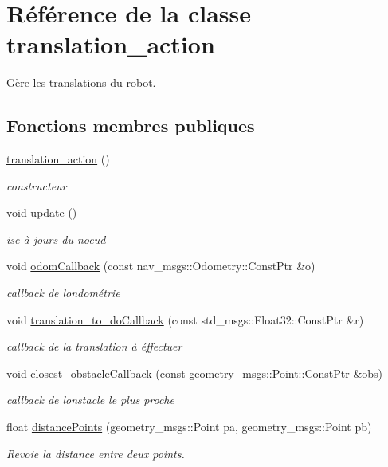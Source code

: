 \hypertarget{classtranslation__action}{}\section{Référence de la classe translation\+\_\+action}
\label{classtranslation__action}


Gère les translations du robot.  


\subsection*{Fonctions membres publiques}
\begin{DoxyCompactItemize}
\item 
\hyperlink{classtranslation__action_ac01e66be5d9431bbef8f70ad6d6afbd8}{translation\+\_\+action} ()
\begin{DoxyCompactList}\small\item\em constructeur \end{DoxyCompactList}\item 
void \hyperlink{classtranslation__action_a4d7d7c1b4d541bba2d845cc09f9512bf}{update} ()
\begin{DoxyCompactList}\small\item\em ise à jours du noeud \end{DoxyCompactList}\item 
void \hyperlink{classtranslation__action_acb5844271ec154e13c895e8aca3290e6}{odom\+Callback} (const nav\+\_\+msgs\+::\+Odometry\+::\+Const\+Ptr \&o)
\begin{DoxyCompactList}\small\item\em callback de l\textquotesingle{}ondométrie \end{DoxyCompactList}\item 
void \hyperlink{classtranslation__action_af58c03fe7e2e0f0db2a05bb30044468d}{translation\+\_\+to\+\_\+do\+Callback} (const std\+\_\+msgs\+::\+Float32\+::\+Const\+Ptr \&r)
\begin{DoxyCompactList}\small\item\em callback de la translation à éffectuer \end{DoxyCompactList}\item 
void \hyperlink{classtranslation__action_a0528c5a0dc70e70d026f97219ddc1a9b}{closest\+\_\+obstacle\+Callback} (const geometry\+\_\+msgs\+::\+Point\+::\+Const\+Ptr \&obs)
\begin{DoxyCompactList}\small\item\em callback de l\textquotesingle{}onstacle le plus proche \end{DoxyCompactList}\item 
float \hyperlink{classtranslation__action_a63ef7dff8b7b1e3e44b8b72389b2bc53}{distance\+Points} (geometry\+\_\+msgs\+::\+Point pa, geometry\+\_\+msgs\+::\+Point pb)
\begin{DoxyCompactList}\small\item\em Revoie la distance entre deux points. \end{DoxyCompactList}\end{DoxyCompactItemize}
